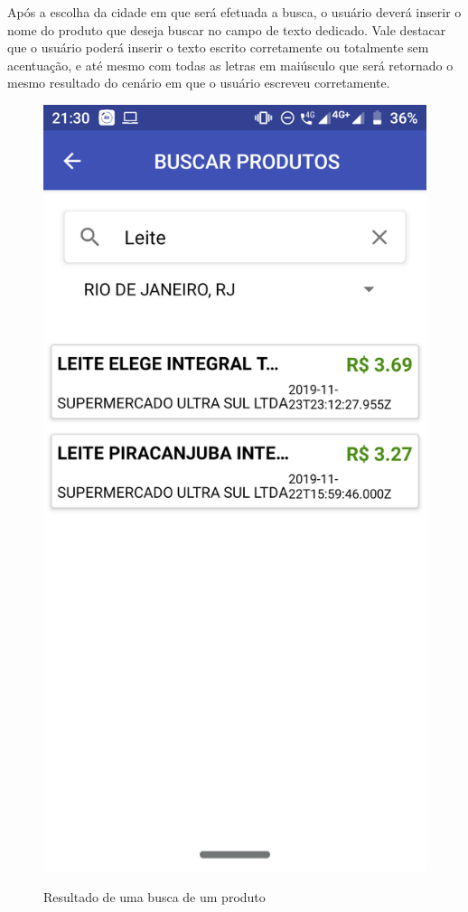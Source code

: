\newpage
Após a escolha da cidade em que será efetuada a busca, o usuário deverá inserir o nome do produto que deseja buscar no campo de texto dedicado. Vale destacar que o usuário poderá inserir o texto escrito corretamente ou totalmente sem acentuação, e até mesmo com todas as letras em maiúsculo que será retornado o mesmo resultado do cenário em que o usuário escreveu corretamente.

\newpage
\begin{figure}[h]
    \centering
    \caption{Resultado de uma busca de um produto}
    \includegraphics[scale=0.15]{tcc/figures/app/app_buscar_produtos_busca.png}
    \label{appBuscaProdutosBuscaResultadoFig}
\end{figure}

